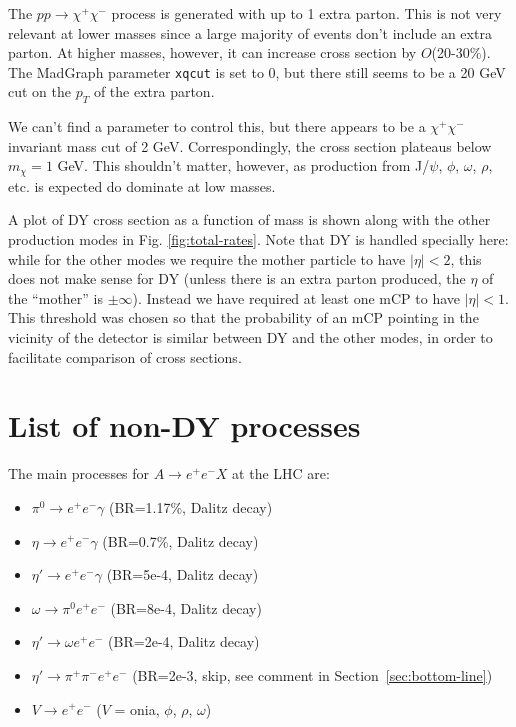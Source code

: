 \documentclass[12pt]{article}
\begin{document}
The $pp\to\chi^+\chi^-$ process is generated with up to 1 extra parton. This is not very 
relevant at lower masses since a large majority of events don't include an extra parton. At 
higher masses, however, it can increase cross section by $O$(20-30\%). The MadGraph
parameter \texttt{xqcut} is set to 0, but there still seems to be a 20 GeV cut on the $p_T$
of the extra parton.

We can't find a parameter to control this, but there appears to be a $\chi^+\chi^-$ invariant
mass cut of 2 GeV. Correspondingly, the cross section plateaus below $m_\chi = 1$ GeV. This shouldn't
matter, however, as production from J/$\psi$, $\phi$, $\omega$, $\rho$, etc. is expected do dominate
at low masses.

A plot of DY cross section as a function of mass is shown along with the other production modes
in Fig. \ref{fig:total-rates}. Note that DY is handled specially here: while for the other modes
we require the mother particle to have $|\eta|<2$, this does not make sense for DY (unless there
is an extra parton produced, the $\eta$ of the ``mother'' is $\pm\infty$). Instead we have required
at least one mCP to have $|\eta|<1$. This threshold was chosen so that the probability of
an mCP pointing in the vicinity of the detector is similar between DY and the other modes, in order
to facilitate comparison of cross sections.



\section{List of non-DY processes}
\label{sec:list}

The main processes for  $A \to e^+ e^- X$ at the LHC are:
\begin{itemize}
    \item $\pi^0 \to e^+ e^- \gamma$  (BR=1.17\%, Dalitz decay)
    \item $\eta \to e^+ e^- \gamma$   (BR=0.7\%, Dalitz decay)
    \item $\eta' \to e^+ e^- \gamma$   (BR=5e-4, Dalitz decay)
    \item $\omega \to \pi^0 e^+ e^-$  (BR=8e-4, Dalitz decay)
    \item $\eta' \to \omega e^+ e^-$ (BR=2e-4, Dalitz decay)
    \item $\eta' \to \pi^+ \pi^- e^+ e^-$ (BR=2e-3, skip, see comment in Section~\ref{sec:bottom-line})
    \item $V \to e^+ e^-$ ($V$ = onia, $\phi$, $\rho$, $\omega$)
\end{itemize}
\end{document}
